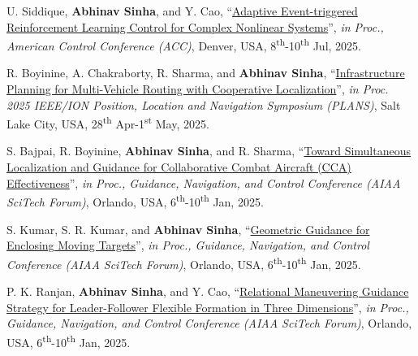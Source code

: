 {\begin{etaremune}[leftmargin=1cm]
		
		
		
		\item U. Siddique, \textbf{Abhinav Sinha}, and Y. Cao, ``\href{https://ieeexplore.ieee.org/document/11107925}{Adaptive Event-triggered Reinforcement Learning Control for Complex Nonlinear Systems}'', \emph{in Proc., American Control Conference (ACC)}, Denver, USA, 8\textsuperscript{th}-10\textsuperscript{th} Jul, 2025.
		\item R. Boyinine, A. Chakraborty, R. Sharma, and \textbf{Abhinav Sinha}, ``\href{https://ieeexplore.ieee.org/document/11028161}{Infrastructure Planning for Multi-Vehicle Routing with Cooperative Localization}'', \emph{in Proc. 2025 IEEE/ION Position, Location and Navigation Symposium (PLANS)}, Salt Lake City, USA, 28\textsuperscript{th} Apr-1\textsuperscript{st} May, 2025.
		\item S. Bajpai, R. Boyinine, \textbf{Abhinav Sinha}, and R. Sharma, ``\href{https://doi.org/10.2514/6.2025-1547}{Toward Simultaneous Localization and Guidance for Collaborative Combat Aircraft (CCA) Effectiveness}'', \emph{in Proc., Guidance, Navigation, and Control Conference (AIAA SciTech Forum)}, Orlando, USA, 6\textsuperscript{th}-10\textsuperscript{th} Jan, 2025.
		\item S. Kumar, S. R. Kumar, and \textbf{Abhinav Sinha}, ``\href{https://doi.org/10.2514/6.2025-2233}{Geometric Guidance for Enclosing Moving Targets}'', \emph{in Proc., Guidance, Navigation, and Control Conference (AIAA SciTech Forum)}, Orlando, USA, 6\textsuperscript{th}-10\textsuperscript{th} Jan, 2025.
		\item P. K. Ranjan, \textbf{Abhinav Sinha}, and Y. Cao, ``\href{https://doi.org/10.2514/6.2025-1901}{Relational Maneuvering Guidance Strategy for Leader-Follower Flexible Formation in Three Dimensions}'', \emph{in Proc., Guidance, Navigation, and Control Conference (AIAA SciTech Forum)}, Orlando, USA, 6\textsuperscript{th}-10\textsuperscript{th} Jan, 2025.

\end{etaremune}}
